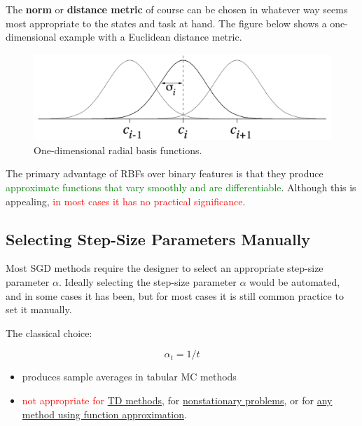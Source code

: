 \documentclass[12pt, a4paper]{article}
\begin{document}
The \textbf{norm} or \textbf{distance metric} of course can be chosen in whatever way seems most appropriate to the states and task at hand. The figure below shows a one-dimensional example with a Euclidean distance metric.

\begin{figure}[H]
  \centering
    \includegraphics[width=0.7\columnwidth]{images/radial-basis-functions.png}
    \caption{One-dimensional radial basis functions.}
    \label{fig:radial-basis-functions}
\end{figure}


The primary advantage of RBFs over binary features is that they produce \textcolor{Green}{approximate functions that vary smoothly and are differentiable}. Although this is appealing, \textcolor{red}{in most cases it has no practical significance}.











\subsection{Selecting Step-Size Parameters Manually}\label{selecting-stepsize-parameters-manually}

Most SGD methods require the designer to select an appropriate step-size parameter $\alpha$. Ideally selecting the step-size parameter $\alpha$ would be automated, and in some cases it has been, but for most cases it is still common practice to set it manually.

The classical choice:

$$
\alpha_t = 1/t
$$
\begin{itemize}
  \item produces sample averages in tabular MC methods
  \item \textcolor{red}{not appropriate for} \uline{TD methods}, for \uline{nonstationary problems}, or for \uline{any method using function approximation}.
\end{itemize}
\end{document}
